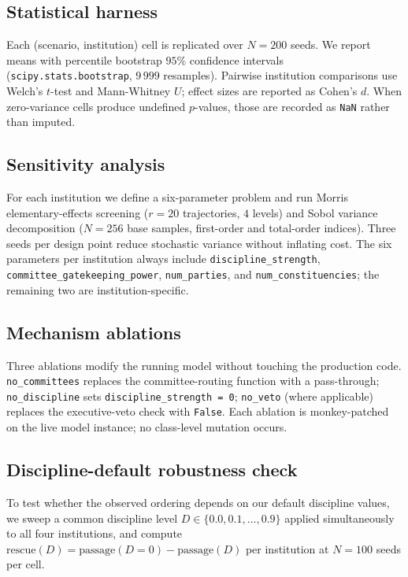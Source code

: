 \documentclass[11pt]{article}
\begin{document}
\subsection{Statistical harness}
Each (scenario, institution) cell is replicated over $N=200$ seeds. We
report means with percentile bootstrap $95\%$ confidence intervals
(\texttt{scipy.stats.bootstrap}, $9\,999$ resamples). Pairwise institution
comparisons use Welch's $t$-test and Mann-Whitney $U$; effect sizes are
reported as Cohen's $d$. When zero-variance cells produce undefined
$p$-values, those are recorded as \texttt{NaN} rather than imputed.

\subsection{Sensitivity analysis}
For each institution we define a six-parameter problem and run Morris
elementary-effects screening ($r=20$ trajectories, $4$ levels) and Sobol
variance decomposition ($N=256$ base samples, first-order and total-order
indices). Three seeds per design point reduce stochastic variance without
inflating cost. The six parameters per institution always include
\texttt{discipline\_strength}, \texttt{committee\_gatekeeping\_power},
\texttt{num\_parties}, and \texttt{num\_constituencies}; the remaining two
are institution-specific.

\subsection{Mechanism ablations}
Three ablations modify the running model without touching the production
code. \texttt{no\_committees} replaces the committee-routing function with
a pass-through; \texttt{no\_discipline} sets
\texttt{discipline\_strength = 0}; \texttt{no\_veto} (where applicable)
replaces the executive-veto check with \texttt{False}. Each ablation is
monkey-patched on the live model instance; no class-level mutation occurs.

\subsection{Discipline-default robustness check}
To test whether the observed ordering depends on our default
discipline values, we sweep a common discipline level
$D \in \{0.0, 0.1, \ldots, 0.9\}$ applied simultaneously to all four
institutions, and compute
$\mathrm{rescue}(D) = \mathrm{passage}(D=0) - \mathrm{passage}(D)$ per
institution at $N=100$ seeds per cell.
\end{document}

